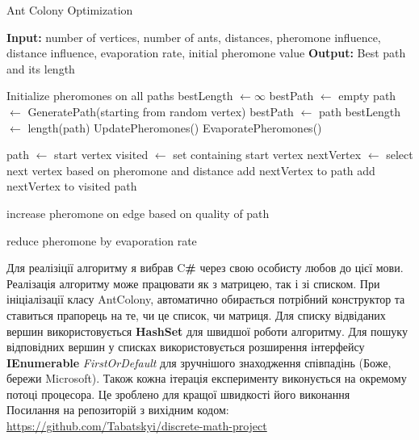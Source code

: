 \documentclass[12pt, letterpaper]{article}
\begin{document}
\begin{algorithm}
    \caption{Ant Colony Optimization}
    \begin{algorithmic}
    \State \textbf{Input:} number of vertices, number of ants, distances, pheromone influence, distance influence, evaporation rate, initial pheromone value
    \State \textbf{Output:} Best path and its length
    
        \State Initialize pheromones on all paths
        \State bestLength $\gets \infty$
        \State bestPath $\gets$ empty
                \State path $\gets$ GeneratePath(starting from random vertex)
                    \State bestPath $\gets$ path
                    \State bestLength $\gets$ length(path)
                \EndIf
            \EndFor
            \State UpdatePheromones()
            \State EvaporatePheromones()
        \EndFor
    \EndProcedure
    
        \State path $\gets$ start vertex
        \State visited $\gets$ set containing start vertex
            \State nextVertex $\gets$ select next vertex based on pheromone and distance
            \State add nextVertex to path
            \State add nextVertex to visited
        \EndWhile
        \State \Return path
    \EndFunction
    
                \State increase pheromone on edge based on quality of path
            \EndFor
        \EndFor
    \EndProcedure
    
            \State reduce pheromone by evaporation rate
        \EndFor
    \EndProcedure
    
    \end{algorithmic}
\end{algorithm}

Для реалізіції алгоритму я вибрав C\textbf{\#} через свою особисту любов до цієї мови.
Реалізація алгоритму може працювати як з матрицею, так і зі списком. 
При ініціалізації класу AntColony, автоматично обирається потрібний конструктор та ставиться прапорець на те, чи це список, чи матриця. 
Для списку відвіданих вершин використовується \textbf{HashSet} для швидшої роботи алгоритму. 
Для пошуку відповідних вершин у списках використовується розширення інтерфейсу \textbf{IEnumerable} \textit{FirstOrDefault} для зручнішого знаходження співпадінь (Боже, бережи Microsoft). 
Також кожна ітерація експерименту виконується на окремому потоці процесора. Це зроблено для кращої швидкості його виконання\\
Посилання на репозиторій з вихідним кодом:\\
\url{https://github.com/Tabatskyi/discrete-math-project}\\
\end{document}
